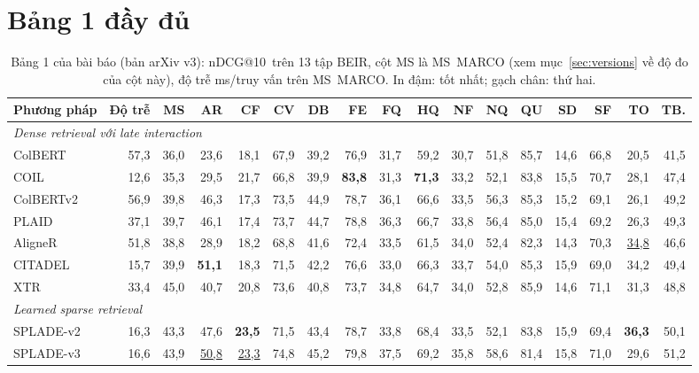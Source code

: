 \documentclass[a4paper,13pt]{extreport}
\makeatletter
\theoremstyle{plain}
\newcommand{\ndcg}{nDCG@10}
\makeatother
\begin{document}
\section{Bảng 1 đầy đủ}
\begin{landscape}
\begin{table}[p]
\centering
\caption[Bảng 1 của bài báo (đầy đủ)]{Bảng 1 của bài báo (bản arXiv v3): \ndcg\ trên 13 tập BEIR, cột MS là MS~MARCO (xem mục~\ref{sec:versions} về độ đo của cột này), độ trễ ms/truy vấn trên MS~MARCO. In đậm: tốt nhất; gạch chân: thứ hai.}
\label{tab:main-paper}
\normalsize
\setlength{\tabcolsep}{7pt}
\begin{tabular}{lrrrrrrrrrrrrrrrr}
\toprule
Phương pháp & Độ trễ & MS & AR & CF & CV & DB & FE & FQ & HQ & NF & NQ & QU & SD & SF & TO & TB.\\
\midrule
\multicolumn{17}{l}{\textit{Dense retrieval với late interaction}}\\
ColBERT & 57,3 & 36,0 & 23,6 & 18,1 & 67,9 & 39,2 & 76,9 & 31,7 & 59,2 & 30,7 & 51,8 & 85,7 & 14,6 & 66,8 & 20,5 & 41,5\\
COIL & 12,6 & 35,3 & 29,5 & 21,7 & 66,8 & 39,9 & \textbf{83,8} & 31,3 & \textbf{71,3} & 33,2 & 52,1 & 83,8 & 15,5 & 70,7 & 28,1 & 47,4\\
ColBERTv2 & 56,9 & 39,8 & 46,3 & 17,3 & 73,5 & 44,9 & 78,7 & 36,1 & 66,6 & 33,5 & 56,3 & 85,3 & 15,2 & 69,1 & 26,1 & 49,2\\
PLAID & 37,1 & 39,7 & 46,1 & 17,4 & 73,7 & 44,7 & 78,8 & 36,3 & 66,7 & 33,8 & 56,4 & 85,0 & 15,4 & 69,2 & 26,3 & 49,3\\
AligneR & 51,8 & 38,8 & 28,9 & 18,2 & 68,8 & 41,6 & 72,4 & 33,5 & 61,5 & 34,0 & 52,4 & 82,3 & 14,3 & 70,3 & \underline{34,8} & 46,6\\
CITADEL & 15,7 & 39,9 & \textbf{51,1} & 18,3 & 71,5 & 42,2 & 76,6 & 33,0 & 66,3 & 33,7 & 54,0 & 85,3 & 15,9 & 69,0 & 34,2 & 49,4\\
XTR & 33,4 & 45,0 & 40,7 & 20,8 & 73,6 & 40,8 & 73,7 & 34,8 & 64,7 & 34,0 & 52,8 & 85,9 & 14,6 & 71,1 & 31,3 & 48,8\\
\midrule
\multicolumn{17}{l}{\textit{Learned sparse retrieval}}\\
SPLADE-v2 & 16,3 & 43,3 & 47,6 & \textbf{23,5} & 71,5 & 43,4 & 78,7 & 33,8 & 68,4 & 33,5 & 52,1 & 83,8 & 15,9 & 69,4 & \textbf{36,3} & 50,1\\
SPLADE-v3 & 16,6 & 43,9 & \underline{50,8} & \underline{23,3} & 74,8 & 45,2 & 79,8 & 37,5 & 69,2 & 35,8 & 58,6 & 81,4 & 15,8 & 71,0 & 29,6 & 51,2\\
\midrule

\end{tabular}
\end{table}
\end{landscape}
\end{document}
